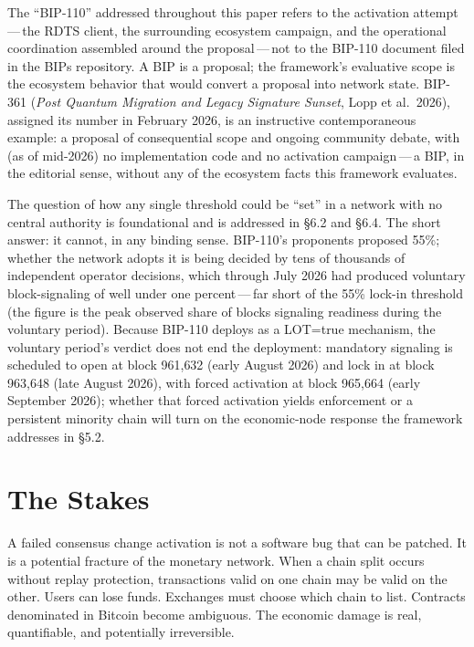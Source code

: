 \documentclass[11pt, twoside, openright]{book}
\newcommand{\sect}[1]{\S#1}
\begin{document}
The ``BIP-110'' addressed throughout this paper refers to the activation attempt\,---\,the RDTS client, the surrounding ecosystem campaign, and the operational coordination assembled around the proposal\,---\,not to the BIP-110 document filed in the BIPs repository. A BIP is a proposal; the framework's evaluative scope is the ecosystem behavior that would convert a proposal into network state. BIP-361 (\textit{Post Quantum Migration and Legacy Signature Sunset}, Lopp et al.~2026), assigned its number in February 2026, is an instructive contemporaneous example: a proposal of consequential scope and ongoing community debate, with (as of mid-2026) no implementation code and no activation campaign\,---\,a BIP, in the editorial sense, without any of the ecosystem facts this framework evaluates.

The question of how any single threshold could be ``set'' in a network with no central authority is foundational and is addressed in \sect{6.2} and \sect{6.4}. The short answer: it cannot, in any binding sense. BIP-110's proponents proposed 55\%; whether the network adopts it is being decided by tens of thousands of independent operator decisions, which through July 2026 had produced voluntary block-signaling of well under one percent\,---\,far short of the 55\% lock-in threshold (the figure is the peak observed share of blocks signaling readiness during the voluntary period). Because BIP-110 deploys as a LOT=true mechanism, the voluntary period's verdict does not end the deployment: mandatory signaling is scheduled to open at block 961{,}632 (early August 2026) and lock in at block 963{,}648 (late August 2026), with forced activation at block 965{,}664 (early September 2026); whether that forced activation yields enforcement or a persistent minority chain will turn on the economic-node response the framework addresses in \sect{5.2}.

\section{The Stakes}

A failed consensus change activation is not a software bug that can be patched. It is a potential fracture of the monetary network. When a chain split occurs without replay protection, transactions valid on one chain may be valid on the other. Users can lose funds. Exchanges must choose which chain to list. Contracts denominated in Bitcoin become ambiguous. The economic damage is real, quantifiable, and potentially irreversible.
\end{document}
